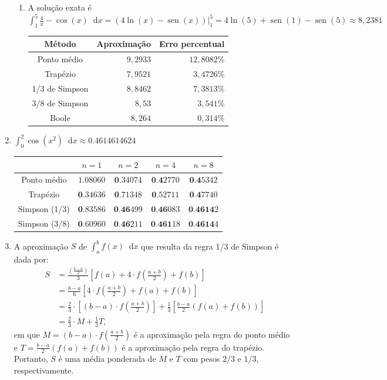 \documentclass[12pt,a4paper]{article}
\newcommand*\sen{\operatorname{sen}}
\newcommand*\diff{\mathop{}\!\mathrm{d}}
\begin{document}
\begin{enumerate}
\begin{enumerate}
\item A solução exata é $\int_1^5 \frac{4}{x} - \cos(x) \diff{x} = \left( 4\ln(x) - \sen(x)\right) \Big|_1^5 = 4\ln(5) + \sen(1) - \sen(5) \approx 8,2381$
\begin{center}
\begin{tabular}{crr}
\hline
Método         & Aproximação & Erro percentual \\ \hline
Ponto médio    & $9,2933$ &  $12,8082\%$  \\
Trapézio       & $7,9521$ & $3,4726\%$ \\
1/3 de Simpson & $8,8462$ & $7,3813\%$ \\
3/8 de Simpson & $8,53$ & $3,541\%$ \\
Boole          & $8,264$ & $0,314\%$ \\
\hline
\end{tabular}
\end{center}
\end{enumerate}
\item $\int_0^2 \cos(x^2)\diff{x} \approx 0.4614614624$
\begin{center}
\begin{tabular}{ccccc}
\hline
              & $n=1$     & $n=2$    & $n=4$   & $n=8$ \\ \hline
Ponto médio   & $1.08060$ & $\textbf{0}.34074$ & $\textbf{0.4}2770$ & $\textbf{0.4}5342$ \\
Trapézio      & $\textbf{0}.34636$ & $\textbf{0}.71348$ & $\textbf{0}.52711$ & $\textbf{0.4}7740$ \\
Simpson (1/3) & $\textbf{0}.83586$ & $\textbf{0.46}499$ & $\textbf{0.46}083$ & $\textbf{0.4614}2$ \\
Simpson (3/8) & $\textbf{0}.60960$ & $\textbf{0.46}211$ & $\textbf{0.461}18$ & $\textbf{0.4614}4$ \\
\hline
\end{tabular}
\end{center}
\item A aproximação $S$ de $\int_a^b f(x)\diff{x}$ que resulta da regra 1/3 de Simpson é dada por:
\begin{align*}
S
& = \frac{\left(\frac{b - a}{2}\right)}{3}\left[ f(a) + 4\cdot f\left(\frac{a + b}{2}\right) + f(b) \right] \\
& = \frac{b - a}{6} \left[ 4\cdot f\left(\frac{a + b}{2}\right) + f(a) + f(b) \right] \\
& = \frac{2}{3} \cdot \left[ (b - a) \cdot f\left(\frac{a + b}{2}\right)\right]
    + \frac{1}{3} \left[ \frac{b - a}{2} \left(f(a) + f(b) \right)\right] \\
& = \frac{2}{3} \cdot M + \frac{1}{3} T,
\end{align*}
em que $M = (b - a) \cdot f\left(\frac{a + b}{2}\right)$ é a aproximação pela regra do ponto médio e $T = \frac{b - a}{2} \left(f(a) + f(b) \right)$ é a aproximação pela regra do trapézio. Portanto, $S$ é uma média ponderada de $M$ e $T$ com pesos $2/3$ e $1/3$, respectivamente.


\end{enumerate}
\end{document}
